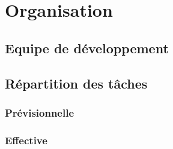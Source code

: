 \section{Organisation}
\subsection{Equipe de développement}
\subsection{Répartition des tâches}
\subsubsection{Prévisionnelle}
\subsubsection{Effective}